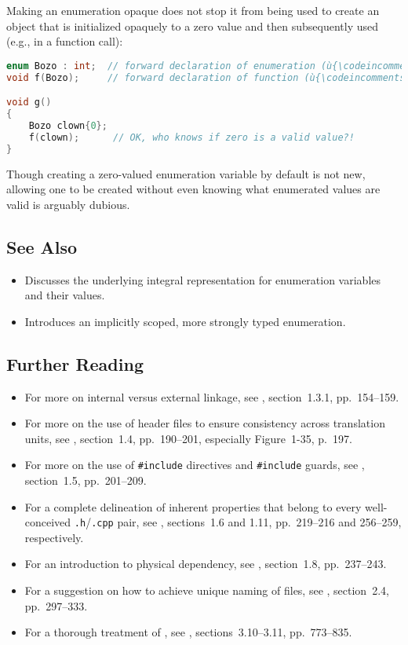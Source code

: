 Making an enumeration opaque does not stop it from being used to create
an object that is initialized opaquely to a zero value and then
subsequently used (e.g., in a function call):

\begin{lstlisting}[language=C++]
enum Bozo : int;  // forward declaration of enumeration (ù{\codeincomments{Bozo}}ù)
void f(Bozo);     // forward declaration of function (ù{\codeincomments{f}}ù)

void g()
{
    Bozo clown{0};
    f(clown);      // OK, who knows if zero is a valid value?!
}
\end{lstlisting}

\noindent Though creating a zero-valued enumeration variable by default is not
new, allowing one to be created without even knowing what enumerated
values are valid is arguably dubious.

\subsection[See Also]{See Also}\label{see-also}

\begin{itemize}
\item{Discusses the underlying integral representation for enumeration variables and their values.}
\item{Introduces an implicitly scoped, more strongly typed enumeration.}
\end{itemize}

\subsection[Further Reading]{Further Reading}\label{further-reading}

\begin{itemize}
\item{For more on internal versus external linkage, see \cite{lakos20}, section~1.3.1, pp.~154--159.}
\item{For more on the use of header files to ensure consistency across translation units, see \cite{lakos20}, section~1.4, pp.~190--201, especially Figure~1-35, p.~197.}
\item{For more on the use of \lstinline!#include! directives and \lstinline!#include! guards, see \cite{lakos20}, section~1.5, pp.~201--209.}
\item{For a complete delineation of inherent properties that belong to every well-conceived \lstinline!.h!/\lstinline!.cpp! pair, see \cite{lakos20}, sections~1.6 and 1.11, pp.~219--216 and 256--259, respectively.}
\item{For an introduction to physical dependency, see \cite{lakos20}, section~1.8, pp.~237--243.}
\item{For a suggestion on how to achieve unique naming of files, see \cite{lakos20}, section~2.4, pp.~297--333.}
\item{For a thorough treatment of , see \cite{lakos20}, sections~3.10--3.11, pp.~773--835.}
\end{itemize}

